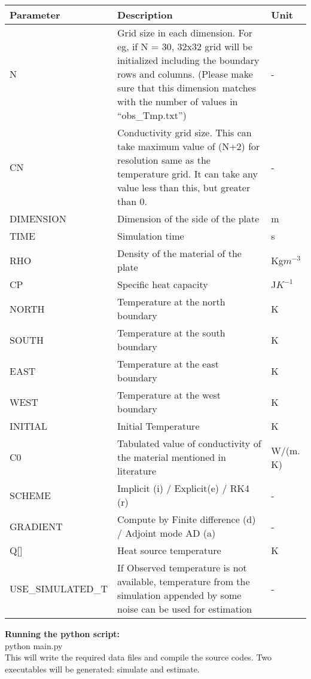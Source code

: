 \documentclass[10pt,a4paper]{report}
\begin{document}
\begin{appendices}
\begin{tabular}{ | m{10em} | m{7cm}| m{1cm} | } 
\hline
\textbf{Parameter} & \textbf{Description} & \textbf{Unit}\\ 
\hline
N& Grid size in each dimension. For eg, if N = 30, 32x32 grid will be initialized including the boundary rows and columns. (Please make sure that this dimension matches with the number of values in “obs\_Tmp.txt”) & - \\ 
\hline
CN & Conductivity grid size. This can take maximum value of (N+2) for resolution same as the temperature grid. It can take any value less than this, but greater than 0. & - \\ 
\hline
DIMENSION & Dimension of the side of the plate & m \\ 
\hline
TIME & Simulation time & s\\
\hline
RHO & Density of the material of the plate & Kg$m^{-3}$\\
\hline
CP & Specific heat capacity & J$K^{-1}$\\
\hline
NORTH & Temperature at the north boundary & K\\
\hline
SOUTH & Temperature at the south boundary & K\\
\hline
EAST & Temperature at the east boundary & K\\
\hline
WEST & Temperature at the west boundary & K\\
\hline
INITIAL & Initial Temperature & K\\
\hline
C0 & Tabulated value of conductivity of the material mentioned in literature & W/(m. K)\\
\hline
SCHEME & Implicit (i) / Explicit(e) / RK4 (r) & -\\
\hline
GRADIENT & Compute by Finite difference (d) / Adjoint mode AD (a) & -\\
\hline
Q[] & Heat source temperature & K\\
\hline
USE\_SIMULATED\_T & If Observed temperature is not available, temperature from the simulation appended by some noise can be used for estimation & -\\
\hline
\end{tabular}
\newpage

\textbf{Running the python script:}\\

python main.py\\


This will write the required data files and compile the source codes. Two executables will be generated: simulate and estimate. 


\end{appendices}
\end{document}
